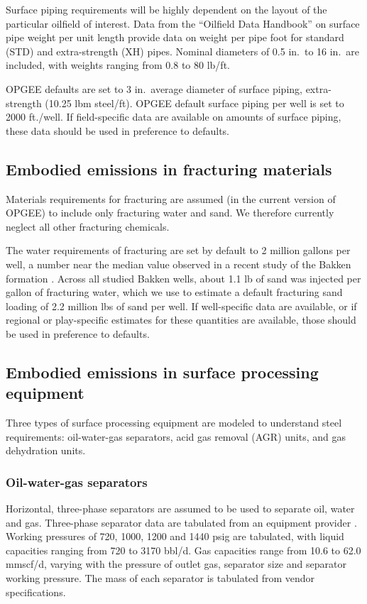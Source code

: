 \documentclass[11pt]{report}
\begin{document}
Surface piping requirements will be highly dependent on the layout of the particular oilfield of interest. Data from the ``Oilfield Data Handbook'' \cite[p.26]{Apex2010} on surface pipe weight per  unit length provide data on weight per pipe foot for standard (STD) and extra-strength (XH) pipes. Nominal diameters of 0.5 in.\ to 16 in.\ are included, with weights ranging from 0.8 to 80 lb/ft.

OPGEE defaults are set to 3 in.\ average  diameter of surface piping, extra-strength (10.25 lbm steel/ft). OPGEE default surface piping per well is set to 2000 ft./well. If field-specific data are available on amounts of surface piping, these data should be used in preference to defaults. 

\subsection{Embodied emissions in fracturing materials}

Materials requirements for fracturing are assumed (in the current version of OPGEE) to include only fracturing water and sand. We therefore currently neglect all other fracturing chemicals.

The water  requirements of fracturing are set by default to 2 million gallons per well, a number near the median value observed in a recent study of the Bakken formation \cite{Brandt2015a}. Across all studied Bakken wells, about 1.1 lb of sand was injected per gallon of fracturing water, which we use to estimate a default fracturing sand loading of 2.2 million lbs of sand per well. If well-specific data are available, or if regional or play-specific estimates for these quantities are available, those should be used in preference to defaults.

\subsection{Embodied emissions in surface processing equipment}

Three types of surface processing equipment are modeled to understand steel requirements: oil-water-gas separators, acid gas removal (AGR) units, and gas dehydration units.

\subsubsection{Oil-water-gas separators}

Horizontal, three-phase separators are assumed to be used to separate oil, water and gas. Three-phase separator data are tabulated from an equipment provider \cite{Surfaceequip2014}. Working pressures of 720, 1000, 1200 and 1440 psig are tabulated, with liquid capacities ranging from 720 to 3170 bbl/d. Gas capacities range from 10.6 to 62.0 mmscf/d, varying with the pressure of outlet gas, separator size and separator working pressure. The mass of each separator is tabulated from vendor specifications.
\end{document}
